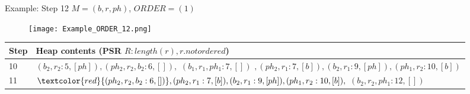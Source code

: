 \begin{frame}{Example: Step 12}
	$M = (b, r, ph)$, $ORDER = (1)$
	
	\begin{figure}[h]
		\texttt{[image: Example\_ORDER\_12.png]}
	\end{figure}
	
	\begin{table}[h]
		\centering
		\begin{tabular}{ |l|p{10cm}| } 
			\hline
			Step & Heap contents (PSR $R : length(r), r.notordered$) \\
			\hline
			10 & $(b_2, r_2 : 5, [ph]), (ph_2, r_2, b_2 : 6, []),$ \st{$(b_1, r_1, ph_1 : 7, [])$} $, (ph_2, r_1 :7, [b]), (b_2, r_1 : 9, [ph]), (ph_1, r_2 : 10, [b])$ \\ 
			\hline
			11 & $\textcolor{red}{(ph_2, r_2, b_2 : 6, [])}, (ph_2, r_1 :7, [b]), (b_2, r_1 : 9, [ph]), (ph_1, r_2 : 10, [b]),$ \st{$(b_2, r_2, ph_1 : 12, [])$} \\ 
			\hline
		\end{tabular}
	\end{table}

\end{frame}

